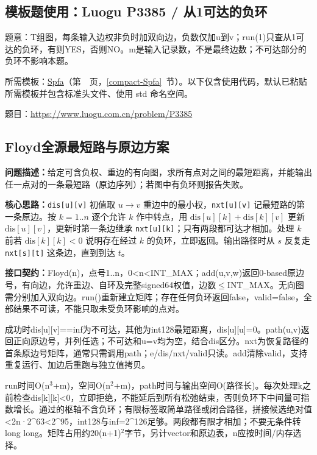 

\Needspace{398pt}

\subsection*{模板题使用：Luogu P3385 / 从1可达的负环}

\label{usage-example-296}

题意：T组图，每条输入边权非负时加双向边，负数仅加u到v；run(1)只查从1可达的负环，有则YES，否则NO。m是输入记录数，不是最终边数；不可达部分的负环不影响本题。

所需模板：\hyperref[compact-Spfa]{Spfa}（第~\pageref{compact-Spfa}~页，\ref{compact-Spfa}~节）。以下仅含使用代码，默认已粘贴所需模板并包含标准头文件、使用 std 命名空间。

题目：\url{https://www.luogu.com.cn/problem/P3385}



\subsection{Floyd全源最短路与原边方案}\label{compact-Floyd}

\noindent\textbf{问题描述：}\allowbreak 给定可含负权、重边的有向图，求所有点对之间的最短距离，并能输出任一点对的一条最短路（原边序列）；若图中有负环则报告失败。

\textbf{核心思路：}\allowbreak \texttt{dis[u][v]} 初值取 $u\to v$ 重边中的最小权，\texttt{nxt[u][v]} 记最短路的第一条原边。按 $k=1..n$ 逐个允许 $k$ 作中转点，用 $\mathrm{dis}[u][k]+\mathrm{dis}[k][v]$ 更新 $\mathrm{dis}[u][v]$，更新时第一条边继承 \texttt{nxt[u][k]}；只有两段都可达才相加。处理 $k$ 前若 $\mathrm{dis}[k][k]<0$ 说明存在经过 $k$ 的负环，立即返回。输出路径时从 $s$ 反复走 \texttt{nxt[s][t]} 这条边，直到到达 $t$。



{\sloppy{}\noindent\textbf{接口契约：}Floyd(n)，点号1..n，0<n<INT\_MAX；add(u,v,w)返回0-based原边号，有向边，允许重边、自环及完整signed64权值，边数$\le$INT\_MAX。无向图需分别加入双向边。run()重新建立矩阵；存在任何负环返回false，valid=false，全部结果不可读，不能只取未受负环影响的点对。

成功时dis[u][v]==inf为不可达，其他为int128最短距离，dis[u][u]=0。path(u,v)返回正向原边号，并列任选；不可达和u=v均为空，结合dis区分。nxt为恢复路径的首条原边号矩阵，通常只需调用path；e/dis/nxt/valid只读。add清除valid，支持重复运行、加边后重跑与独立值拷贝。

run时间O(n$^{3}$+m)，空间O(n$^{2}$+m)，path时间与输出空间O(路径长)。每次处理k之前检查dis[k][k]<0，立即拒绝，不能延后到所有松弛结束，否则负环下中间量可指数增长。通过的枢轴不含负环；有限标签取简单路径或闭合路径，拼接候选绝对值<2n·2\textasciicircum{}63<2\textasciicircum{}95，int128与inf=2\textasciicircum{}126足够。两段都有限才相加；不要无条件转long long。矩阵占用约20(n+1)$^{2}$字节，另计vector和原边表，n应按时间/内存选择。\par}


